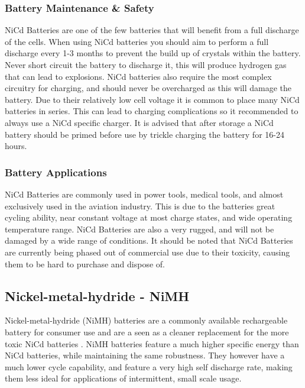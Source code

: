 \documentclass[a4paper,11pt]{article}
\begin{document}
\begin{multicols}{2}
\subsubsection{Battery Maintenance \& Safety}

NiCd Batteries are one of the few batteries that will benefit from a full discharge of the cells. When using NiCd batteries you should aim to perform a full discharge every 1-3 months to prevent the build up of crystals within the battery. Never short circuit the battery to discharge it, this will produce hydrogen gas that can lead to explosions. 
NiCd batteries also require the most complex circuitry for charging, and should never be overcharged as this will damage the battery. Due to their relatively low cell voltage it is common to place many NiCd batteries in series. This can lead to charging complications so it recommended to always use a NiCd specific charger.
It is advised that after storage a NiCd battery should be primed before use by trickle charging the battery for 16-24 hours.

\subsubsection{Battery Applications}

NiCd Batteries are commonly used in power tools, medical tools, and almost exclusively used in the aviation industry. This is due to the batteries great cycling ability, near constant voltage at most charge states, and wide operating temperature range. NiCd Batteries are also a very rugged, and will not be damaged by a wide range of conditions. It should be noted that NiCd Batteries are currently being phased out of commercial use due to their toxicity, causing them to be hard to purchase and dispose of.  

\subsection{Nickel-metal-hydride - NiMH}

Nickel-metal-hydride (NiMH) batteries are a commonly available rechargeable battery for consumer use and are a seen as a cleaner replacement for the more toxic NiCd batteries . NiMH batteries feature a much higher specific energy than NiCd batteries, while maintaining the same robustness. They however have a much lower cycle capability, and feature a very high self discharge rate, making them less ideal for applications of intermittent, small scale usage. 


\end{multicols}
\end{document}
